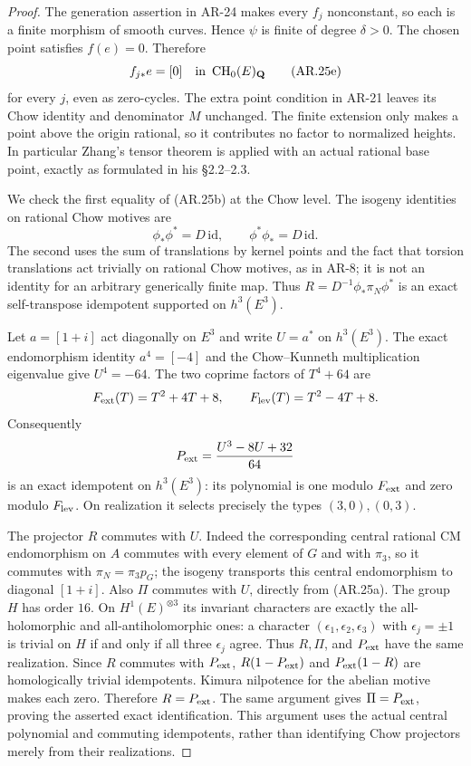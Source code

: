 \begin{proof}
The generation assertion in AR-24 makes every $f_j$ nonconstant,
so each is a finite morphism of smooth curves.  Hence $\psi$ is
finite of degree $\delta>0$.  The chosen point satisfies $f(e)=0$.
Therefore
\[
 f_{j*}e=[0]\quad\hbox{in }\operatorname{CH}_0(E)_\mathbf Q
                                                               \tag{AR.25e}
\]
for every $j$, even as zero-cycles.  The extra point condition in
AR-21 leaves its Chow identity and denominator $M$ unchanged.
The finite extension only makes a point above the origin rational,
so it contributes no factor to normalized heights.  In particular
Zhang's tensor theorem is applied with an actual rational base
point, exactly as formulated in his \S2.2--2.3.

We check the first equality of (AR.25b) at the Chow level.  The
isogeny identities on rational Chow motives are
\[
 \phi_*\phi^*=D\,\mathrm{id},\qquad
 \phi^*\phi_*=D\,\mathrm{id}.                           \tag{AR.25f}
\]
The second uses the sum of translations by kernel points and the
fact that torsion translations act trivially on rational Chow
motives, as in AR-8; it is not an identity for an arbitrary
generically finite map.  Thus
$R=D^{-1}\phi_*\pi_N\phi^*$ is an exact self-transpose idempotent
supported on $h^3(E^3)$.

Let $a=[1+i]$ act diagonally on $E^3$ and write $U=a^*$ on
$h^3(E^3)$.  The exact endomorphism identity $a^4=[-4]$ and the
Chow--Kunneth multiplication eigenvalue give
$U^4=-64$.  The two coprime factors of $T^4+64$ are
\[
 F_{\rm ext}(T)=T^2+4T+8,\qquad
 F_{\rm lev}(T)=T^2-4T+8.
\]
Consequently
\[
 P_{\rm ext}=\frac{U^3-8U+32}{64}
\]
is an exact idempotent on $h^3(E^3)$: its polynomial is one modulo
$F_{\rm ext}$ and zero modulo $F_{\rm lev}$.  On realization it
selects precisely the types $(3,0),(0,3)$.

The projector $R$ commutes with $U$.  Indeed the corresponding
central rational CM endomorphism on $A$ commutes with every element
of $G$ and with $\pi_3$, so it commutes with $\pi_N=\pi_3p_G$;
the isogeny transports this central endomorphism to diagonal
$[1+i]$.  Also $\Pi$ commutes with $U$, directly from (AR.25a).
The group $H$ has order $16$.  On $H^1(E)^{\otimes3}$ its invariant
characters are exactly the all-holomorphic and all-antiholomorphic
ones: a character $(\epsilon_1,\epsilon_2,\epsilon_3)$ with
$\epsilon_j=\pm1$ is trivial on $H$ if and only if all three
$\epsilon_j$ agree.  Thus $R,\Pi$, and $P_{\rm ext}$ have the same
realization.  Since $R$ commutes with $P_{\rm ext}$,
$R(1-P_{\rm ext})$ and $P_{\rm ext}(1-R)$ are homologically
trivial idempotents.  Kimura nilpotence for the abelian motive makes
each zero.  Therefore $R=P_{\rm ext}$.  The same argument gives
$\Pi=P_{\rm ext}$, proving the asserted exact identification.
This argument uses the actual central polynomial and commuting
idempotents, rather than identifying Chow projectors merely from
their realizations.


\end{proof}
